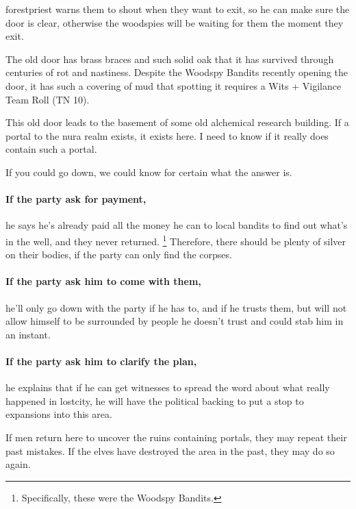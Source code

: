 \begin{multicols}{2}
\Gls{forestpriest} warns them to shout when they want to exit, so he can make sure the door is clear, otherwise the woodspies will be waiting for them the moment they exit.


The old door has brass braces and such solid oak that it has survived through centuries of rot and nastiness.
Despite the Woodspy Bandits recently opening the door, it has such a covering of mud that spotting it requires a Wits + Vigilance Team Roll (TN 10).

\begin{speechtext}
  This old door leads to the basement of some old alchemical research building.
  If a portal to the nura realm exists, it exists here.
  I need to know if it really does contain such a portal.

  If you could go down, we could know for certain what the answer is.
\end{speechtext}

\paragraph{If the party ask for payment,}
he says he's already paid all the money he can to local bandits to find out what's in the well, and they never returned.%
\footnote{Specifically, these were the Woodspy Bandits.}
Therefore, there should be plenty of silver on their bodies, if the party can only find the corpses.

\paragraph{If the party ask him to come with them,}
he'll only go down with the party if he has to, and if he trusts them, but will not allow himself to be surrounded by people he doesn't trust and could stab him in an instant.

\forestpriest

\paragraph{If the party ask him to clarify the plan,}
he explains that if he can get witnesses to spread the word about what really happened in \gls{lostcity}, he will have the political backing to put a stop to expansions into this area.

If men return here to uncover the ruins containing portals, they may repeat their past mistakes.
If the elves have destroyed the area in the past, they may do so again.


\end{multicols}
